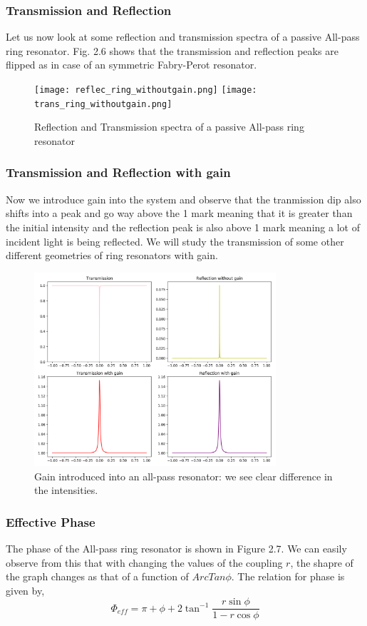 \subsubsection{Transmission and Reflection}
Let us now look at some reflection and transmission spectra of a passive All-pass ring resonator. Fig. 2.6 shows that the transmission and reflection peaks are flipped as in case of an symmetric Fabry-Perot resonator.
\begin{figure}[h]
\texttt{[image: reflec\_ring\_withoutgain.png]}
\texttt{[image: trans\_ring\_withoutgain.png]}
\caption{Reflection and Transmission spectra of a passive All-pass ring resonator}
\end{figure}

\subsubsection{Transmission and Reflection with gain}
Now we introduce gain into the system and observe that the tranmission dip also shifts into a peak and go way above the 1 mark meaning that it is greater than the initial intensity and the reflection peak is also above 1 mark meaning a lot of incident light is being reflected. We will study the transmission of some other different geometries of ring resonators with gain. 

\begin{figure}[h]
\centering
\includegraphics[width=0.80\textwidth]{all-pall_gain.png}
\caption{Gain introduced into an all-pass resonator: we see clear difference in the intensities.}
\end{figure}


\subsubsection{Effective Phase}
The phase of the All-pass ring resonator is shown in Figure 2.7. We can easily observe from this that with changing the values of the coupling $r$, the shapre of the graph changes as that of a function of $ArcTan\phi$. The relation for phase is given by,
\begin{equation}
\Phi_{eff} = \pi + \phi + 2\tan^{-1}\frac{r\sin\phi}{1-r\cos\phi}
\end{equation}

